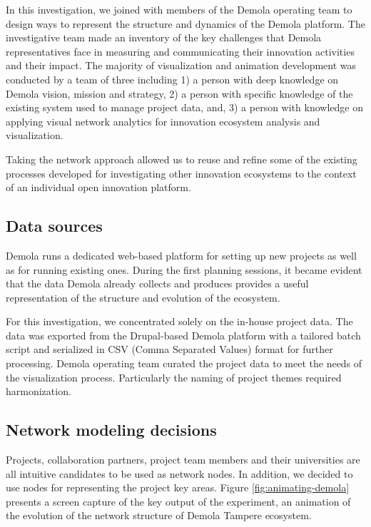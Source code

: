 In this investigation, we joined with members of the Demola operating team to design ways to represent the structure and dynamics of the Demola platform. The investigative team made an inventory of the key challenges that Demola representatives face in measuring and communicating their innovation activities and their impact. The majority of visualization and animation development was conducted by a team of three including 1) a person with deep knowledge on Demola vision, mission and strategy, 2) a person with specific knowledge of the existing system used to manage project data, and, 3) a person with knowledge on applying visual network analytics for innovation ecosystem analysis and visualization.

Taking the network approach allowed us to reuse and refine some of the existing processes developed for investigating other innovation ecosystems to the context of an individual open innovation platform.

\subsection{Data sources}

Demola runs a dedicated web-based platform for setting up new projects as well as for running existing ones. During the first planning sessions, it became evident that the data Demola already collects and produces provides a useful representation of the structure and evolution of the ecosystem.

For this investigation, we concentrated solely on the in-house project data. The data was exported from the Drupal-based Demola platform with a tailored batch script and serialized in CSV (Comma Separated Values) format for further processing. Demola operating team curated the project data to meet the needs of the visualization process. Particularly the naming of project themes required harmonization.

\subsection{Network modeling decisions}

Projects, collaboration partners, project team members and their universities are all intuitive candidates to be used as network nodes. In addition, we decided to use nodes for representing the project key areas. Figure \ref{fig:animating-demola} presents a screen capture of the key output of the experiment, an animation of the evolution of the network structure of Demola Tampere ecosystem.

